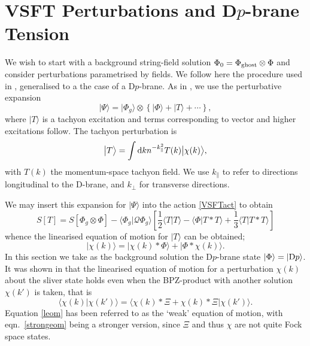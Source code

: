 \documentclass[letterpaper,12pt]{article}
\def\Pcm#1{{\mathcal{#1}}}
\def\er#1{eqn.~\eqref{#1}}
\newcommand{\Dp}{\textup{D}p}
\newcommand{\td}{\textup{d}}
\begin{document}
\section{VSFT Perturbations and D$p$-brane Tension}
\label{VSFTP}
We wish to start with a background string-field solution $\Phi_0=\Phi_{\textup{ghost}}\otimes\Phi$ 
and consider perturbations parametrised by fields. We follow here the procedure used 
in \cite{RV}, generalised to a the case of a D$p$-brane.
 As in \cite{RSZ6}, we use the perturbative expansion
\begin{equation}
\big| \Psi \big\rangle =  \big| \Phi_g \big\rangle \otimes
        \left\{
          \big|\Phi \big\rangle + \big|T\big\rangle + \cdots
        \right\}
,\end{equation}
where $|T\rangle$ is a tachyon excitation and terms corresponding to vector 
and higher excitations follow.
The tachyon perturbation is
\begin{equation}
 \big|T\big\rangle = \int \td k n^{-k_\parallel^2} T(k) \big|\chi(k)\big\rangle 
,\end{equation}
with $T(k)$ the momentum-space tachyon field. We use $k_\parallel$ to refer to
directions longitudinal to the D-brane, and $k_\perp$ for transverse directions.

We may insert this expansion for $|\Psi\rangle$ into the action \eqref{VSFTact}
to obtain 
\begin{equation}
\label{Tact}
S[T]=S[\Phi_g\otimes\Phi]-\big\langle\Phi_g\big|\Pcm{Q}\Phi_g\big\rangle
                  \left[
                    \frac12 \big\langle T\big|T\big\rangle
                    - \big\langle\Phi\big|T * T\big\rangle
                    + \frac13 \big\langle T\big|T * T\big\rangle
                  \right]
\end{equation}
whence the linearised equation of motion for $|T\rangle$ can be obtained;
\begin{equation}
\label{leom}
 \big|\chi(k)\big\rangle = \big|\chi(k) * \Phi \big\rangle + \big|\Phi * \chi(k)\big\rangle
.\end{equation}
In this section we take as the background solution the D$p$-brane state $|\Phi\rangle=|\Dp\rangle$.
It was shown in \cite{RV} that the linearised equation of motion for a perturbation $\chi(k)$
about the sliver state holds even when
the BPZ-product with another solution $\chi(k')$ is taken, that is
\begin{equation}
\label{strongeom}
 \big\langle\chi(k)\big|\chi(k')\big\rangle = 
     \big\langle \chi(k) * \Xi + \chi(k) * \Xi \big| \chi(k') \big\rangle
.\end{equation}
Equation \eqref{leom} has been referred to as the `weak' equation of motion, with \er{strongeom}
being a stronger version, since $\Xi$ and thus $\chi$ are not quite Fock space states.
\end{document}
